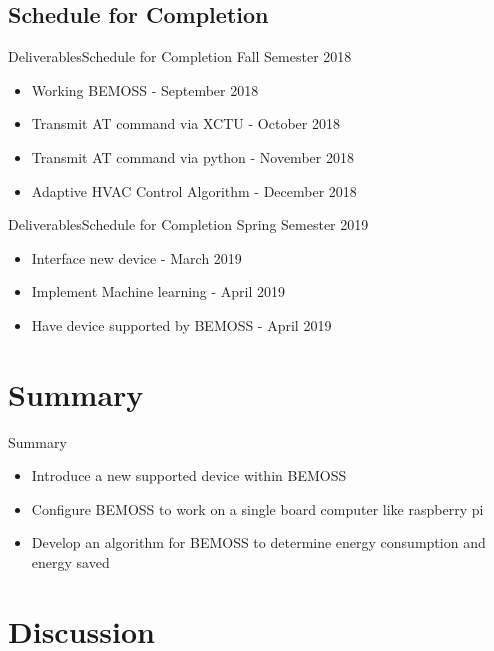 \documentclass{beamer}
\begin{document}

\subsection{Schedule for Completion}

\begin{frame}{Deliverables}{Schedule for Completion}
  Fall Semester 2018
  \begin{itemize}
        \item Working BEMOSS - September 2018
        \item Transmit AT command via XCTU - October 2018
        \item Transmit AT command via python - November 2018
        \item Adaptive HVAC Control Algorithm - December 2018
        \end{itemize}
\end{frame}

\begin{frame}{Deliverables}{Schedule for Completion}
    Spring Semester 2019
    \begin{itemize}

        \item Interface new device - March 2019
        \item Implement Machine learning - April 2019
        \item Have device supported by BEMOSS - April 2019
    \end{itemize}
\end{frame}



\section*{Summary}

\begin{frame}{Summary}
  \begin{itemize}
  \item
    Introduce a new supported device within BEMOSS
  \item
    Configure BEMOSS to work on a single board computer like raspberry pi
  \item 
  Develop an algorithm for BEMOSS to determine energy consumption and energy saved
  \end{itemize}
\end{frame}
\section{Discussion}
\end{document}
